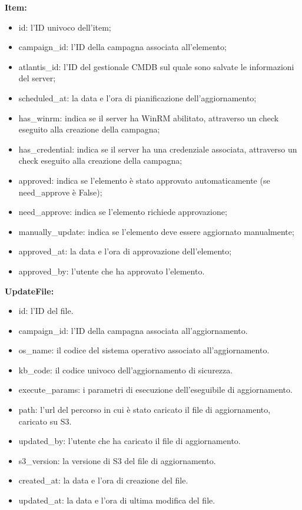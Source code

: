 \textbf{Item:}
\begin{itemize}
\item id: l'ID univoco dell’item;
\item campaign\_id: l’ID della campagna associata all'elemento;
\item atlantis\_id: l'ID del gestionale CMDB sul quale sono salvate le informazioni del server;
\item scheduled\_at: la data e l'ora di pianificazione dell'aggiornamento;
\item has\_winrm: indica se il server ha WinRM abilitato, attraverso un check eseguito alla creazione della campagna;
\item has\_credential: indica se il server ha una credenziale associata, attraverso un check eseguito alla creazione della campagna;
\item approved: indica se l'elemento è stato approvato automaticamente (se need\_approve è False);
\item need\_approve: indica se l'elemento richiede approvazione;
\item manually\_update: indica se l'elemento deve essere aggiornato manualmente;
\item approved\_at: la data e l'ora di approvazione dell'elemento;
\item approved\_by: l'utente che ha approvato l'elemento.
\end{itemize}

\textbf{UpdateFile:}
\begin{itemize}
\item id: l'ID del file.
\item campaign\_id: l'ID della campagna associata all'aggiornamento.
\item os\_name: il codice del sistema operativo associato all'aggiornamento.
\item kb\_code: il codice univoco dell'aggiornamento di sicurezza.
\item execute\_params: i parametri di esecuzione dell'eseguibile di aggiornamento.
\item path: l'url del percorso in cui è stato caricato il file di aggiornamento, caricato su S3.
\item updated\_by: l'utente che ha caricato il file di aggiornamento.
\item s3\_version: la versione di S3 del file di aggiornamento.
\item created\_at: la data e l'ora di creazione del file.
\item updated\_at: la data e l'ora di ultima modifica del file.
\end{itemize}

